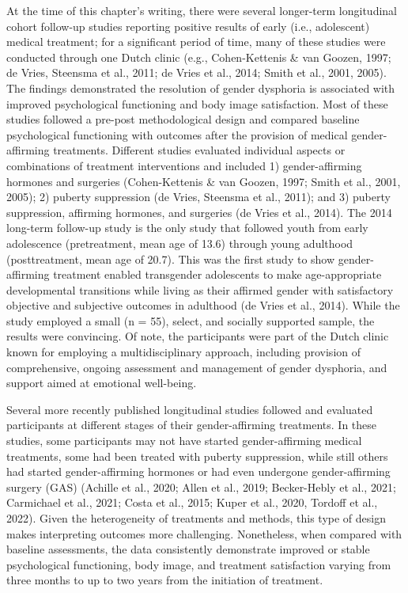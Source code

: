 \documentclass[
]{book}
\begin{document}
At the time of this chapter's writing, there were
several longer-term longitudinal cohort follow-up
studies reporting positive results of early (i.e.,
adolescent) medical treatment; for a significant
period of time, many of these studies were conducted through one Dutch clinic (e.g.,
Cohen-Kettenis \& van Goozen, 1997; de Vries,
Steensma et al., 2011; de Vries et al., 2014; Smith
et al., 2001, 2005). The findings demonstrated
the resolution of gender dysphoria is associated
with improved psychological functioning and
body image satisfaction. Most of these studies
followed a pre-post methodological design and
compared baseline psychological functioning with
outcomes after the provision of medical
gender-affirming treatments. Different studies
evaluated individual aspects or combinations of
treatment interventions and included 1)
gender-affirming hormones and surgeries
(Cohen-Kettenis \& van Goozen, 1997; Smith
et al., 2001, 2005); 2) puberty suppression (de
Vries, Steensma et al., 2011); and 3) puberty suppression, affirming hormones, and surgeries (de
Vries et al., 2014). The 2014 long-term follow-up
study is the only study that followed youth from
early adolescence (pretreatment, mean age of
13.6) through young adulthood (posttreatment,
mean age of 20.7). This was the first study to
show gender-affirming treatment enabled transgender adolescents to make age-appropriate
developmental transitions while living as their
affirmed gender with satisfactory objective and
subjective outcomes in adulthood (de Vries et al.,
2014). While the study employed a small (n =
55), select, and socially supported sample, the
results were convincing. Of note, the participants
were part of the Dutch clinic known for employing a multidisciplinary approach, including provision of comprehensive, ongoing assessment and
management of gender dysphoria, and support
aimed at emotional well-being.

Several more recently published longitudinal
studies followed and evaluated participants at
different stages of their gender-affirming treatments. In these studies, some participants may
not have started gender-affirming medical treatments, some had been treated with puberty suppression, while still others had started
gender-affirming hormones or had even undergone gender-affirming surgery (GAS) (Achille
et al., 2020; Allen et al., 2019; Becker-Hebly et al.,
2021; Carmichael et al., 2021; Costa et al., 2015;
Kuper et al., 2020, Tordoff et al., 2022). Given
the heterogeneity of treatments and methods, this
type of design makes interpreting outcomes more
challenging. Nonetheless, when compared with
baseline assessments, the data consistently demonstrate improved or stable psychological functioning, body image, and treatment satisfaction
varying from three months to up to two years
from the initiation of treatment.
\end{document}
